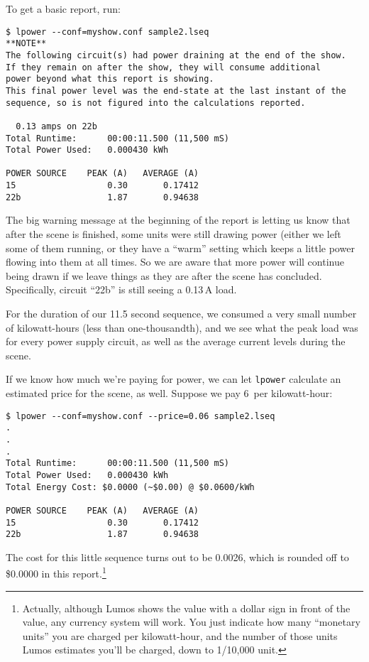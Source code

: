 \documentclass{article}
\begin{document}
To get a basic report, run:

\begin{verbatim}
$ lpower --conf=myshow.conf sample2.lseq
**NOTE**
The following circuit(s) had power draining at the end of the show.
If they remain on after the show, they will consume additional
power beyond what this report is showing.
This final power level was the end-state at the last instant of the
sequence, so is not figured into the calculations reported.

  0.13 amps on 22b
Total Runtime:      00:00:11.500 (11,500 mS)
Total Power Used:   0.000430 kWh

POWER SOURCE    PEAK (A)   AVERAGE (A)
15                  0.30       0.17412
22b                 1.87       0.94638
\end{verbatim}

The big warning message at the beginning of the report is letting us
know that after the scene is finished, some units were still drawing
power (either we left some of them running, or they have a ``warm''
setting which keeps a little power flowing into them at all times.
So we are aware that more power will continue being drawn if we leave
things as they are after the scene has concluded.
Specifically, circuit ``22b'' is still seeing a 0.13\,A load.

For the duration of our 11.5 second sequence, we consumed a very small
number of kilowatt-hours (less than one-thousandth), and we see what the
peak load was for every power supply circuit, as well as the average
current levels during the scene.

If we know how much we're paying for power, we can let {\tt lpower}
calculate an estimated price for the scene, as well.  Suppose we pay
6\textcent\ per kilowatt-hour:

\begin{verbatim}
$ lpower --conf=myshow.conf --price=0.06 sample2.lseq
.
.
.
Total Runtime:      00:00:11.500 (11,500 mS)
Total Power Used:   0.000430 kWh
Total Energy Cost: $0.0000 (~$0.00) @ $0.0600/kWh

POWER SOURCE    PEAK (A)   AVERAGE (A)
15                  0.30       0.17412
22b                 1.87       0.94638
\end{verbatim}

The cost for this little sequence turns out to be 0.0026\textcent,
which is rounded off to \$0.0000 in this report.\footnote{Actually, although Lumos shows the value with a dollar sign
in front of the value, any currency system will work.  You just indicate how many
``monetary units'' you are charged per kilowatt-hour, and the number of those units
Lumos estimates you'll be charged, down to 1/10,000 unit.}
\end{document}
